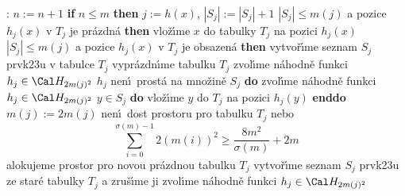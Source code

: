 : \newline 
$n:=n+1$ \newline 
{\bf if} $n\le m$ {\bf then}\newline 
\phantom{---}$j:=h(x)$, $|S_j|:=|S_j|+1$\newline 
\phantom{---}{\bf if} $|S_j|\le m(j)$ a pozice $h_j(x)$ v $T_j$ je pr\'azdn\'a {\bf then}\newline 
\phantom{------}vlo\v z\'\i me $x$ do tabulky $T_j$  na pozici $
h_j(x)$\newline 
\phantom{---}{\bf else}\newline 
\phantom{------}{\bf if} $|S_j|\le m(j)$ a pozice $h_j(x)$ v $T_
j$ je obsazen\'a {\bf then}\newline 
\phantom{---------}vytvo\v r\'\i me seznam $S_j$ prvk\accent23u v tabulce $
T_j$\newline 
\phantom{---------}vypr\'azdn\'\i me tabulku $T_j$\newline 
\phantom{---------}zvol\'\i me n\'ahodn\v e funkci $h_j\in \Cal H_{2m(j)^2}$\newline 
\phantom{---------}{\bf while} $h_j$ nen\'\i\ prost\'a na mno\v zin\v e $S_j$ {\bf do}\newline
\phantom{------------}zvol\'\i me n\'ahodn\v e funkci $h_j\in \Cal H_{2m(j)^2}$\newline 
\phantom{---------}{\bf enddo}\newline
\phantom{---------}{\bf for every} $y\in S_j$ {\bf do} vlo\v z\'\i me $
y$ do $T_j$ na pozici $h_j(y)$ {\bf enddo}\newline 
\phantom{------}{\bf else}\newline 
\phantom{---------}$m(j):=2m(j)$\newline 
\phantom{---------}{\bf if} nen\'\i\ dost prostoru pro tabulku $
T_j$ nebo 
$$\sum_{i=0}^{\sigma (m)-1}2(m(i))^2\ge\frac {8m^2}{\sigma (m)}+2
m$$
\phantom{---------}{\bf then}\newline 
\phantom{------------}{\bf RehashAll}\newline 
\phantom{---------}{\bf else}\newline 
\phantom{------------}alokujeme prostor pro novou pr\'azdnou tabulku $
T_j$ \newline 
\phantom{------------}vytvo\v r\'\i me seznam $S_j$ prvk\accent23u ze star\'e tabulky $T_j$ a zru\v s\'\i me ji\newline 
\phantom{------------}zvol\'\i me n\'ahodn\v e funkci $
h_j\in \Cal H_{2m(j)^2}$\newline

